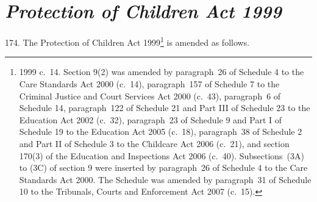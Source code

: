 \documentclass[12pt,a4paper]{article}
\begin{document}
\section*{\itshape Protection of Children Act 1999}

174.  The Protection of Children Act 1999\footnote{1999 c.~14. Section 9(2) was amended by paragraph~26 of Schedule 4 to the Care Standards Act 2000 (c.~14), paragraph~157 of Schedule 7 to the Criminal Justice and Court Services Act 2000 (c.~43), paragraph~6 of Schedule 14, paragraph~122 of Schedule 21 and Part III of Schedule 23 to the Education Act 2002 (c.~32), paragraph~23 of Schedule 9 and Part I of Schedule 19 to the Education Act 2005 (c.~18), paragraph~38 of Schedule 2 and Part II of Schedule 3 to the Childcare Act 2006 (c.~21), and section 170(3) of the Education and Inspections Act 2006 (c.~40). Subsections~(3A) to (3C) of section 9 were inserted by paragraph~26 of Schedule 4 to the Care Standards Act 2000. The Schedule was amended by paragraph~31 of Schedule 10 to the Tribunals, Courts and Enforcement Act 2007 (c.~15).} is amended as follows.

\medskip
\end{document}
